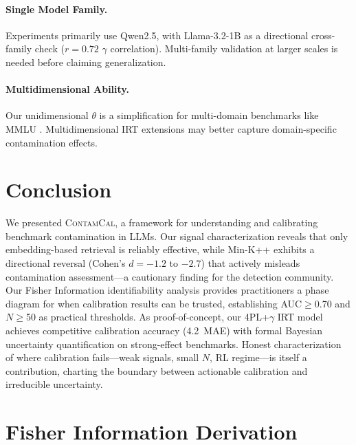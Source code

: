 \documentclass[11pt,a4paper]{article}
\newcommand{\contamcal}{\textsc{ContamCal}}
\newcommand{\pp}{\,\text{pp}}
\begin{document}
\paragraph{Single Model Family.}
Experiments primarily use Qwen2.5, with Llama-3.2-1B as a directional cross-family check ($r = 0.72$ $\gamma$ correlation).
Multi-family validation at larger scales is needed before claiming generalization.

\paragraph{Multidimensional Ability.}
Our unidimensional $\theta$ is a simplification for multi-domain benchmarks like MMLU \citep{reckase2009multidimensional,burnell2023rethinking}.
Multidimensional IRT extensions may better capture domain-specific contamination effects.

\section{Conclusion}
\label{sec:conclusion}

We presented \contamcal{}, a framework for understanding and calibrating benchmark contamination in LLMs.
Our signal characterization reveals that only embedding-based retrieval is reliably effective, while Min-K++ exhibits a directional reversal (Cohen's $d = -1.2$ to $-2.7$) that actively misleads contamination assessment---a cautionary finding for the detection community.
Our Fisher Information identifiability analysis provides practitioners a phase diagram for when calibration results can be trusted, establishing AUC$\geq$0.70 and $N\geq$50 as practical thresholds.
As proof-of-concept, our 4PL+$\gamma$ IRT model achieves competitive calibration accuracy (4.2\pp{} MAE) with formal Bayesian uncertainty quantification on strong-effect benchmarks.
Honest characterization of where calibration fails---weak signals, small $N$, RL regime---is itself a contribution, charting the boundary between actionable calibration and irreducible uncertainty.




\appendix
\section{Fisher Information Derivation}
\label{app:fisher}
\end{document}
